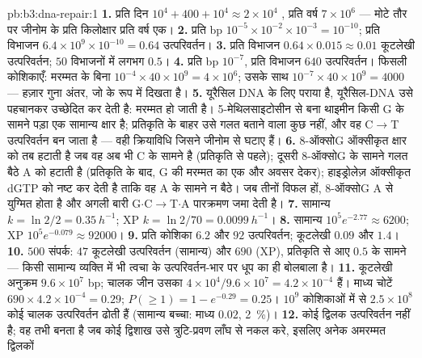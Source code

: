 \begin{solution}{pb:b3:dna-repair:1}
\textbf{1.} प्रति दिन $10^{4} + 400 + 10^{4} \approx 2\times 10^{4}$
, प्रति वर्ष $7\times 10^{6}$ --- मोटे तौर पर जीनोम के प्रति
किलोक्षार प्रति वर्ष एक।
\textbf{2.} प्रति bp $10^{-5}\times 10^{-2}\times 10^{-3} = 10^{-10}$;
प्रति विभाजन $6.4\times 10^{9}\times 10^{-10} = 0.64$ उत्परिवर्तन।
\textbf{3.} प्रति विभाजन $0.64\times 0.015 \approx 0.01$ कूटलेखी
उत्परिवर्तन; $50$ विभाजनों में लगभग $0.5$।
\textbf{4.} प्रति bp $10^{-7}$, प्रति विभाजन $640$ उत्परिवर्तन। फिसली
कोशिकाएँ: मरम्मत के बिना $10^{-4}\times 40\times 10^{9} = 4\times 10^{6}$;
उसके साथ $10^{-7}\times 40\times 10^{9} = 4000$ --- हज़ार गुना
अंतर, जो  के रूप में दिखता है।
\textbf{5.} यूरैसिल DNA के लिए पराया है, यूरैसिल-DNA  उसे
पहचानकर उच्छेदित कर देती है: मरम्मत हो जाती है। 5-मेथिलसाइटोसीन से बना
थाइमीन किसी G के सामने पड़ा एक सामान्य क्षार है; प्रतिकृति के बाहर उसे
गलत बताने वाला कुछ नहीं, और वह C$\to$T उत्परिवर्तन बन जाता है --- वही
क्रियाविधि जिसने जीनोम से  घटाए हैं।
\textbf{6.} 8-ऑक्सोG  ऑक्सीकृत क्षार को तब हटाती है जब वह
अब भी C के सामने है (प्रतिकृति से पहले); दूसरी  8-ऑक्सोG
के सामने गलत बैठे A को हटाती है (प्रतिकृति के बाद, G की मरम्मत का एक
और अवसर देकर); हाइड्रोलेज़ ऑक्सीकृत dGTP को नष्ट कर देती है ताकि वह A
के सामने न बैठे। जब तीनों विफल हों, 8-ऑक्सोG A से युग्मित होता है और
अगली बारी G$\cdot$C$\to$T$\cdot$A पारक्रमण जमा देती है।
\textbf{7.} सामान्य $k = \ln 2/2 = \qty{0.35}{h^{-1}}$; XP $k = \ln 2/70
= \qty{0.0099}{h^{-1}}$।
\textbf{8.} सामान्य $10^{5} e^{-2.77} \approx 6200$; XP $10^{5}
e^{-0.079} \approx \num{92000}$।
\textbf{9.} प्रति कोशिका $6.2$ और $92$ उत्परिवर्तन; कूटलेखी $0.09$ और $1.4$।
\textbf{10.} $500$ संपर्क: $47$ कूटलेखी उत्परिवर्तन (सामान्य) और $690$
(XP), प्रतिकृति से आए $0.5$ के सामने --- किसी सामान्य व्यक्ति में भी
त्वचा के उत्परिवर्तन-भार पर धूप का ही बोलबाला है।
\textbf{11.} कूटलेखी अनुक्रम $9.6\times 10^{7}$ bp; चालक जीन उसका
$4\times 10^{4}/9.6\times 10^{7} = 4.2\times 10^{-4}$ हैं। माध्य
चोटें $690\times 4.2\times 10^{-4} = 0.29$; $P(\ge 1) = 1 - e^{-0.29} =
0.25$। $10^{9}$ कोशिकाओं में से $2.5\times 10^{8}$ कोई चालक उत्परिवर्तन
ढोती हैं (सामान्य बच्चा: माध्य $0.02$, \qty{2}{\%})।
\textbf{12.} कोई द्विलक उत्परिवर्तन नहीं है; वह तभी बनता है जब कोई
द्विशाख उसे त्रुटि-प्रवण लाँघ से नकल करे, इसलिए अनेक अमरम्मत द्विलकों

\end{solution}

